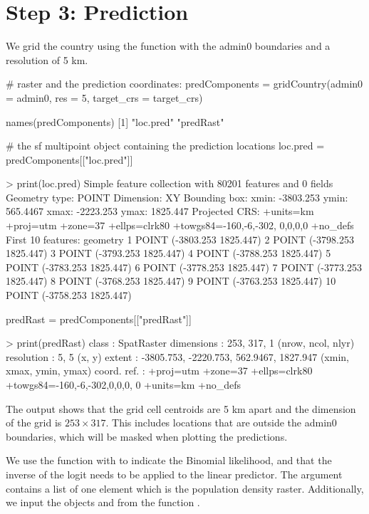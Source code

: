 \section{Step 3: Prediction \label{sec:estPred}} 
We grid the country using the function  with  the admin0 boundaries and a resolution of 5 km.

\begin{example}
# raster and the prediction coordinates:
predComponents = gridCountry(admin0 = admin0, 
                             res = 5, 
                             target_crs = target_crs)

names(predComponents)
[1] "loc.pred" "predRast"

# the sf multipoint object containing the prediction locations
loc.pred = predComponents[["loc.pred"]]

> print(loc.pred)
Simple feature collection with 80201 features and 0 fields
Geometry type: POINT
Dimension:     XY
Bounding box:  xmin: -3803.253 ymin: 565.4467 
               xmax: -2223.253 ymax: 1825.447
Projected CRS: +units=km +proj=utm +zone=37 +ellps=clrk80 +towgs84=-160,-6,-302,
0,0,0,0 +no_defs
First 10 features:
                     geometry
1  POINT (-3803.253 1825.447)
2  POINT (-3798.253 1825.447)
3  POINT (-3793.253 1825.447)
4  POINT (-3788.253 1825.447)
5  POINT (-3783.253 1825.447)
6  POINT (-3778.253 1825.447)
7  POINT (-3773.253 1825.447)
8  POINT (-3768.253 1825.447)
9  POINT (-3763.253 1825.447)
10 POINT (-3758.253 1825.447)

predRast = predComponents[["predRast"]]

> print(predRast)
class       : SpatRaster 
dimensions  : 253, 317, 1  (nrow, ncol, nlyr)
resolution  : 5, 5  (x, y)
extent      : -3805.753, -2220.753, 562.9467, 1827.947  
             (xmin, xmax, ymin, ymax)
coord. ref. : +proj=utm +zone=37 +ellps=clrk80 +towgs84=-160,-6,-302,0,0,0,
0 +units=km +no_defs 
\end{example}

The output shows that the grid cell centroids are 5 km apart and the dimension of the grid is $253 \times 317$. This includes locations that are outside the admin0 boundaries, which will be masked when plotting the predictions.


We use the function  with  to indicate the Binomial likelihood, and that the inverse of the logit needs to be applied to the linear predictor. The argument  contains a list of one element which is the population density raster. Additionally, we input the objects  and  from the function . 

